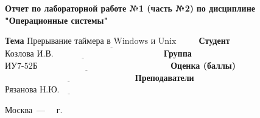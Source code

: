 \begin{titlepage}
	
	\begin{center}
		\Large\textbf{  Отчет по лабораторной работе №1 (часть №2)}\newline
		\textbf{по дисциплине "Операционные системы"}\newline\newline
	\end{center}
	
\noindent\textbf{Тема} $\underline{\text{Прерывание таймера в Windows и Unix~~~~~~~}}$\newline\newline
\noindent\textbf{Студент} $\underline{\text{Козлова И.В.~~~~~~~~~~~~~~~~~~~~~~~~~~~~~~~~~~~~~~}}$\newline\newline
\noindent\textbf{Группа} $\underline{\text{ИУ7-52Б~~~~~~~~~~~~~~~~~~~~~~~~~~~~~~~~~~~~~~~~~~~~~~}}$\newline\newline
\noindent\textbf{Оценка (баллы)} $\underline{\text{~~~~~~~~~~~~~~~~~~~~~~~~~~~~~~~~~~~~~~~~~~~~~}}$\newline\newline
\noindent\textbf{Преподаватели} $\underline{\text{Рязанова Н.Ю.~~~~~~~~~~~~~~~~~~~~~~~~~~}}$\newline\newline\newline

	
	\begin{center}
		\vfill
		Москва~---~\the\year
		~г.
	\end{center}
	\restoregeometry
\end{titlepage}

